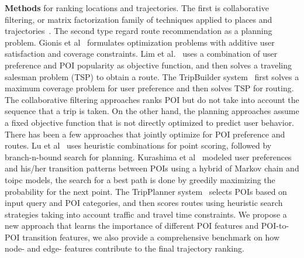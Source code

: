 {\bf Methods} for ranking locations and trajectories. 
The first is collaborative filtering, or matrix factorization family of techniques applied to places and trajectories~\cite{shi2011personalized,ijcai13,zhang2015location}. The second type regard route recommendation as a planning problem. Gionis et al~\cite{wsdm14} formulates optimization problems with additive user satisfaction and coverage constraints. Lim et al.~\cite{ijcai15} uses a combination of user preference and POI popularity as objective function, and then solves a traveling salesman problem (TSP) to obtain a route. 
The TripBuilder system~\cite{brilhante2013shall} first solves a maximum coverage problem for user preference and then solves TSP for routing. The collaborative filtering approaches ranks POI but do not take into account the sequence that a trip is taken. On the other hand, the planning approaches assume a fixed objective function that is not directly optimized to predict user behavior. There has been a few approaches that jointly optimize for POI preference and routes. Lu et al~\cite{lu2012personalized} uses heuristic combinations for point scoring, followed by branch-n-bound search for planning. Kurashima et al~\cite{kurashima2010geotag} modeled user preferences and his/her transition patterns between POIs using a hybrid of Markov chain and toipc models, the search for a best path is done by greedily maximizing the probability for the next point. The TripPlanner system~\cite{chen2015tripplanner} selects POIs based on input query and POI categories, and then scores routes using heuristic search strategies taking into account traffic and travel time constraints. 
We propose a new approach that learns the importance of different POI features and POI-to-POI transition features, we also provide a comprehensive benchmark on how node- and edge- features contribute to the final trajectory ranking. 



